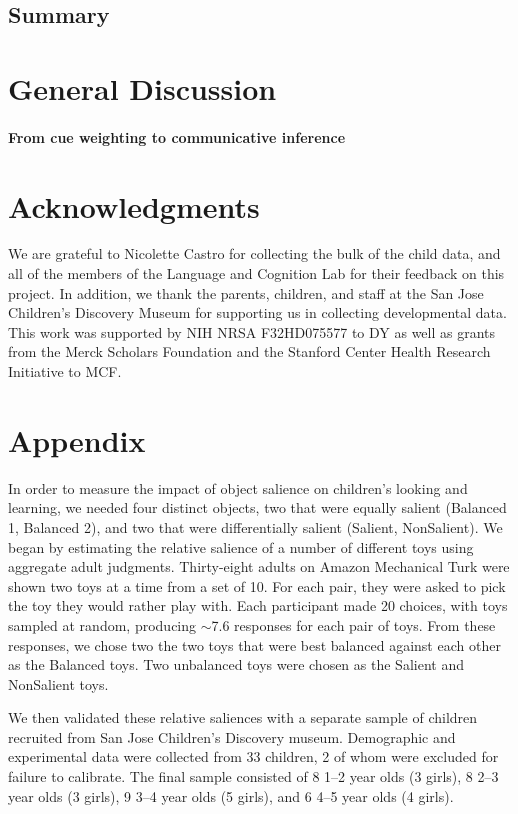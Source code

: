 \documentclass[man,floatsintext]{apa6}
\begin{document}
\subsection{Summary}
\section{General Discussion}

\paragraph{From cue weighting to communicative inference}

\section{Acknowledgments}

We are grateful to Nicolette Castro for collecting the bulk of the child data, and all of the members of the Language and Cognition Lab for their feedback on this project. In addition, we thank the parents, children, and staff at the San Jose Children's Discovery Museum for supporting us in collecting developmental data. This work was supported by NIH NRSA F32HD075577 to DY as well as grants from the Merck Scholars Foundation and the Stanford Center Health Research Initiative to MCF.

\section{Appendix}
\renewcommand\thefigure{A\arabic{figure}}   
\setcounter{figure}{0}    

In order to measure the impact of object salience on children's looking and learning, we needed four distinct objects, two that were equally salient (Balanced 1, Balanced 2), and two that were differentially salient (Salient, NonSalient). We began by estimating the relative salience of a number of different toys using aggregate adult judgments. Thirty-eight adults on Amazon Mechanical Turk were shown two toys at a time from a set of 10. For each pair, they were asked to pick the toy they would rather play with. Each participant made 20 choices, with toys sampled at random, producing $\sim$7.6 responses for each pair of toys. From these responses, we chose two  the two toys that were best balanced against each other as the Balanced toys. Two unbalanced toys were chosen as the Salient and NonSalient toys.

We then validated these relative saliences with a separate sample of children recruited from San Jose Children's Discovery museum. Demographic and experimental data were collected from 33 children, 2 of whom were excluded for failure to calibrate. The final sample consisted of 8 1--2 year olds (3 girls), 8 2--3 year olds (3 girls), 9 3--4 year olds (5 girls), and 6 4--5 year olds (4 girls).
\end{document}
